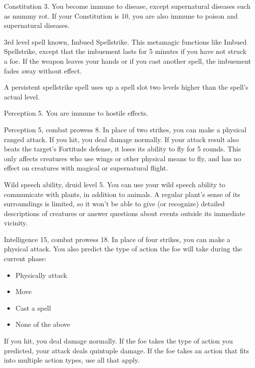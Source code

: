 \featpre Constitution 3.
\featben You become immune to disease, except supernatural diseases such as mummy rot.
If your Constitution is 10, you are also immune to poison and supernatural diseases.

\featpres 3rd level spell known, Imbued Spellstrike.
\featben This metamagic functions like Imbued Spellstrike, except that the imbuement lasts for 5 minutes if you have not struck a foe.
If the weapon leaves your hands or if you cast another spell, the imbuement fades away without effect.

A persistent spellstrike spell uses up a spell slot two levels higher than the spell's actual level.

\featpre Perception 5.
\featben You are immune to hostile  effects.

\featpres Perception 5, combat prowess 8.
\featben In place of two strikes, you can make a physical ranged attack.
If you hit, you deal damage normally.
If your attack result also beats the target's Fortitude defense, it loses its ability to fly for 5 rounds.
This only affects creatures who use wings or other physical means to fly, and has no effect on creatures with magical or supernatural flight.

\featpres Wild speech ability, druid level 5.
\featben You can use your wild speech ability to communicate with plants, in addition to animals.
A regular plant's sense of its surroundings is limited, so it won't be able to give (or recognize) detailed descriptions of creatures or answer questions about events outside its immediate vicinity.

\featpres Intelligence 15, combat prowess 18.
\featben In place of four strikes, you can make a physical attack.
You also predict the type of action the foe will take during the current phase:
\begin{itemize}
    \item Physically attack
    \item Move
    \item Cast a spell
    \item None of the above
\end{itemize}
If you hit, you deal damage normally.
If the foe takes the type of action you predicted, your attack deals quintuple damage.
If the foe takes an action that fits into multiple action types, use all that apply.

